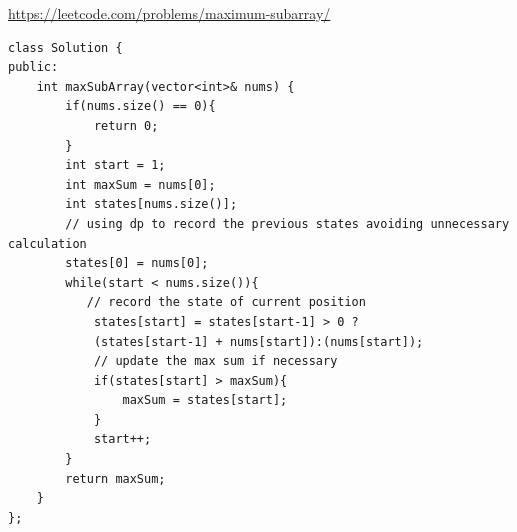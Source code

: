 \documentclass[12pt]{article}
\begin{document}
\begin{enumerate}
   \url{https://leetcode.com/problems/maximum-subarray/}

\begin{verbatim}
class Solution {
public:
    int maxSubArray(vector<int>& nums) {
        if(nums.size() == 0){
            return 0;
        }
        int start = 1;
        int maxSum = nums[0];
        int states[nums.size()];
        // using dp to record the previous states avoiding unnecessary calculation
        states[0] = nums[0];
        while(start < nums.size()){
           // record the state of current position
            states[start] = states[start-1] > 0 ? 
            (states[start-1] + nums[start]):(nums[start]);
            // update the max sum if necessary
            if(states[start] > maxSum){
                maxSum = states[start];
            }
            start++;
        }
        return maxSum;
    }
};
\end{verbatim}
	
\end{enumerate}
\end{document}
